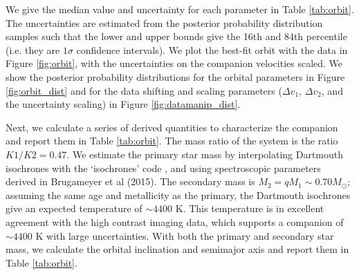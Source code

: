 \documentclass[twocolumn]{emulateapj}
\begin{document}
 We give the median value and uncertainty for each parameter in Table \ref{tab:orbit}. The uncertainties are estimated from the posterior probability distribution samples such that the lower and upper bounds give the 16th and 84th percentile (i.e. they are $1\sigma$ confidence intervals). We plot the best-fit orbit with the data in Figure \ref{fig:orbit}, with the uncertainties on the companion velocities scaled. We show the posterior probability distributions for the orbital parameters in Figure \ref{fig:orbit_dist} and for the data shifting and scaling parameters ($\Delta v_1$, $\Delta v_2$, and the uncertainty scaling) in Figure \ref{fig:datamanip_dist}.

Next, we calculate a series of derived quantities to characterize the companion and report them in Table \ref{tab:orbit}. The mass ratio of the system is the ratio $K1/K2 = 0.47$. We estimate the primary star mass by interpolating Dartmouth isochrones \citep{Dotter2008} with the `isochrones' code \citep[described in][]{Montet2015}, and using spectroscopic parameters derived in Brugameyer et al (2015). The secondary mass is $M_2 = qM_1 \sim 0.70 M_{\odot}$; assuming the same age and metallicity as the primary, the Dartmouth isochrones give an expected temperature of $\sim 4400 $ K. This temperature is in excellent agreement with the high contrast imaging data, which supports a companion of $\sim 4400$ K with large uncertainties. With both the primary and secondary star mass, we calculate the orbital inclination and semimajor axis and report them in Table \ref{tab:orbit}.
\end{document}

